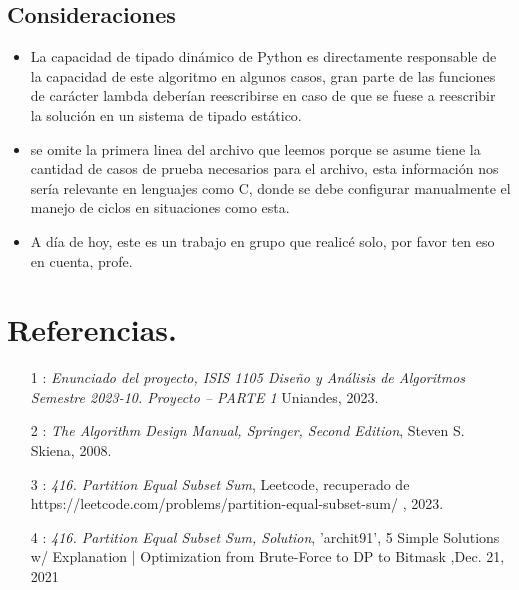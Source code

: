 \documentclass[a4paper]{article}
\begin{document}
\subsection{Consideraciones}
\begin{itemize}
    \item La capacidad de tipado dinámico de Python es directamente responsable de
    la capacidad de este algoritmo en algunos casos, gran parte de las funciones
    de carácter lambda deberían reescribirse en caso de que se fuese a reescribir la solución
    en un sistema de tipado estático.
    \item se omite la primera linea del archivo que leemos porque se asume tiene la
    cantidad de casos de prueba necesarios para el archivo, esta información nos
    sería relevante en lenguajes como C, donde se debe configurar manualmente el manejo
    de ciclos en situaciones como esta.
    \item A día de hoy, este es un trabajo en grupo que realicé solo, por favor ten eso
    en cuenta, profe.
\end{itemize}
\section{Referencias.}
\begin{itemize}
    \item [1]: \textit{Enunciado del proyecto, ISIS 1105 Diseño y Análisis de Algoritmos
    Semestre 2023-10. Proyecto – PARTE 1} Uniandes, 2023.
    \item [2]: \textit{The Algorithm Design Manual, Springer, Second Edition}, Steven S. Skiena, 2008.
    \item [3]: \textit{416. Partition Equal Subset Sum}, Leetcode, recuperado de 
    https://leetcode.com/problems/partition-equal-subset-sum/ , 2023.
    \item [4]: \textit{416. Partition Equal Subset Sum, Solution}, 'archit91', 5 Simple Solutions w/ Explanation 
    | Optimization from Brute-Force to DP to Bitmask ,Dec. 21, 2021
\end{itemize}
\end{document}
